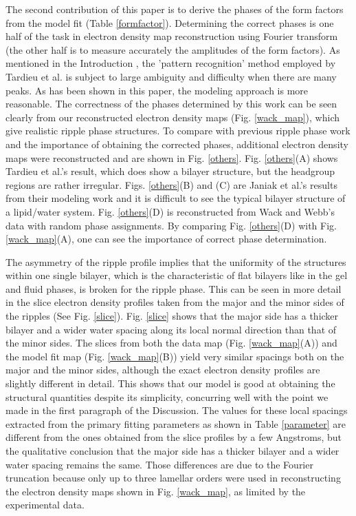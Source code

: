 The second contribution of this paper is to derive the phases of the
form factors from the model fit (Table \ref{formfactor}). Determining
the correct phases is one half of the task in electron density map
reconstruction using Fourier transform (the other half is to measure accurately
the amplitudes of the form factors). As mentioned in the Introduction
, the 'pattern recognition' method employed by Tardieu et al. 
\cite{Tar73} is subject to large ambiguity and difficulty when there are 
many peaks. As has been shown in this paper, the modeling approach is more
reasonable. The correctness of the phases determined by this work
can be seen clearly from our reconstructed electron density maps 
(Fig. \ref{wack_map}), which give realistic ripple phase structures. To 
compare with previous ripple phase work and
the importance of obtaining the corrected phases, additional electron density
maps were reconstructed and are shown in Fig. \ref{others}.
Fig. \ref{others}(A) shows Tardieu et al.'s result, which does show
a bilayer structure, but the headgroup regions are rather
irregular. Figs. \ref{others}(B) and (C) are Janiak et al.'s results 
from their modeling work and it is difficult to see 
the typical bilayer structure 
of a lipid/water system.  Fig. \ref{others}(D) is reconstructed from Wack and 
Webb's data \cite{Wac89a} with random phase assignments. By comparing 
Fig. \ref{others}(D)
with Fig. \ref{wack_map}(A), one can see the importance of 
correct phase determination.

The asymmetry of the ripple profile implies that the uniformity of the 
structures within one single bilayer, which is the characteristic of flat 
bilayers like in the gel and fluid phases, is broken for the 
ripple phase. This
can be seen in more detail in the slice electron density profiles taken
from the major and the minor sides of the ripples (See Fig. \ref{slice}).
Fig. \ref{slice} shows that the major side has a thicker bilayer and a wider
water spacing along its local normal direction than that of the minor sides.
The slices from both the data map (Fig. \ref{wack_map}(A)) and the model fit
map (Fig. \ref{wack_map}(B)) yield very similar spacings both on the major
and the minor sides, although the exact
electron density profiles are slightly different in detail. This shows that
our model is good at obtaining the structural quantities despite its
simplicity, concurring well with the point we made in the first paragraph of
the Discussion. The values for these local spacings extracted from the primary
fitting parameters as shown in Table \ref{parameter} are different from the
ones obtained from the slice profiles by a few Angstroms, but the qualitative
conclusion that the major side has a thicker bilayer and a wider water spacing
remains the same. Those differences are due to the Fourier truncation 
because only up to three lamellar orders were used in reconstructing the
electron density maps shown in Fig. \ref{wack_map}, as limited by the 
experimental data.

